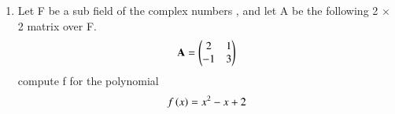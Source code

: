 \renewcommand{\theequation}{\theenumi}
\renewcommand{\thefigure}{\theenumi}
\begin{enumerate}[label=\thesubsection.\arabic*.,ref=\thesubsection.\theenumi]

\item Let F be a sub field of the complex numbers , and let A be the following 2 $\times$ 2 matrix over F.
\begin{align}
  \mathbf{A}=\begin{pmatrix}2&1\\-1&3\end{pmatrix}  
\end{align}
compute f for the polynomial
\begin{align}
    f\left(x\right)=x^{2}-x+2
\end{align}
%
\\
\solution

\end{enumerate}

